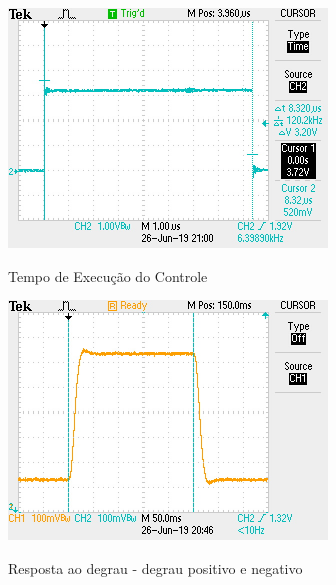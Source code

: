 \documentclass[
	12pt,				%
	article,			%
	openright,			%
	oneside,
	a4paper,			%
	chapter=TITLE,		%
	section=TITLE,		%
	english,			%
	french,				%
	spanish,			%
	brazil,				%
]{abntex2}
\begin{document}
\begin{apendicesenv}
        	\begin{figure}[htbp]
            	\centering
            	\caption{Tempo de Execução do Controle}
            	\includegraphics[width=\textwidth,height=240px,keepaspectratio]{imgs/ftmf/control_execution_time.JPG}
            	\label{fig-ftmf-execution_time}
        	\end{figure}
        	
        	\begin{figure}[htbp]
            	\centering
            	\caption{Resposta ao degrau - degrau positivo e negativo}
            	\includegraphics[width=\textwidth,height=240px,keepaspectratio]{imgs/ftmf/step_response_both_steps.JPG}
            	\label{fig-ftmf-step_response_both_steps}
        	\end{figure}
        	
        	\FloatBarrier
        	
        	\clearpage
	
	\end{apendicesenv}
	
	
%		
%		
	
	
	
	\printindex
		
\end{document}
